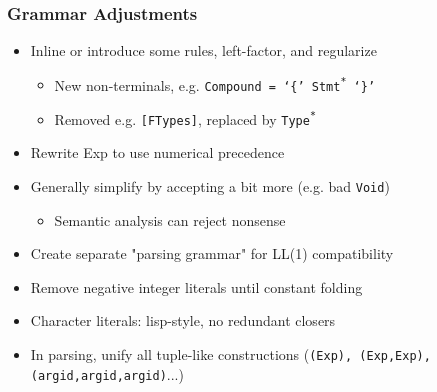 \documentclass{beamer}
\begin{document}
\begin{frame}
    \frametitle{Grammar Adjustments}
    \begin{itemize}[<+(1)->]
        \item Inline or introduce some rules, left-factor, and regularize
            \begin{itemize}[<+(1)->]
                \item New non-terminals, e.g. \texttt{Compound = `\{'
                    Stmt\textsuperscript{*} `\}' }
                \item Removed e.g. \texttt{[FTypes]}, replaced by
                    \texttt{Type\textsuperscript{*}}
            \end{itemize}
        \item Rewrite Exp to use numerical precedence
        \item Generally simplify by accepting a bit more (e.g. bad
            \texttt{Void})
            \begin{itemize}[<+(1)->]
                \item Semantic analysis can reject nonsense
            \end{itemize}
        \item Create separate "parsing grammar" for LL(1) compatibility
        \item Remove negative integer literals until constant folding
        \item Character literals: lisp-style, no redundant closers
        \item In parsing, unify all tuple-like constructions (\texttt{(Exp),
            (Exp,Exp), (argid,argid,argid)}...)
    \end{itemize}
\end{frame}
\end{document}
